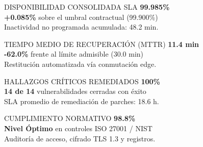 \documentclass[11pt,letterpaper]{article}
\begin{document}
\noindent
\begin{minipage}[t]{0.485\textwidth}
  \begin{corpmetric}{DISPONIBILIDAD CONSOLIDADA SLA}
    {\fontsize{18}{20}\selectfont\bfseries\color{corpPrimary} 99.985\%}\\[2pt]
    {\footnotesize\color{corpSuccess}\textbf{+0.085\%} sobre el umbral contractual (99.900\%)}\\[1pt]
    {\scriptsize\color{corpTextMuted}Inactividad no programada acumulada: 48.2 min.}
  \end{corpmetric}
\end{minipage}\hfill
\begin{minipage}[t]{0.485\textwidth}
  \begin{corpmetric}{TIEMPO MEDIO DE RECUPERACI\'ON (MTTR)}
    {\fontsize{18}{20}\selectfont\bfseries\color{corpPrimary} 11.4 min}\\[2pt]
    {\footnotesize\color{corpSuccess}\textbf{-62.0\%} frente al l\'imite admisible (30.0 min)}\\[1pt]
    {\scriptsize\color{corpTextMuted}Restituci\'on automatizada v\'ia conmutaci\'on edge.}
  \end{corpmetric}
\end{minipage}

\vspace{0.3em}

\noindent
\begin{minipage}[t]{0.485\textwidth}
  \begin{corpmetric}{HALLAZGOS CR\'ITICOS REMEDIADOS}
    {\fontsize{18}{20}\selectfont\bfseries\color{corpPrimary} 100\%}\\[2pt]
    {\footnotesize\color{corpSuccess}\textbf{14 de 14} vulnerabilidades cerradas con \'exito}\\[1pt]
    {\scriptsize\color{corpTextMuted}SLA promedio de remediaci\'on de parches: 18.6 h.}
  \end{corpmetric}
\end{minipage}\hfill
\begin{minipage}[t]{0.485\textwidth}
  \begin{corpmetric}{CUMPLIMIENTO NORMATIVO}
    {\fontsize{18}{20}\selectfont\bfseries\color{corpPrimary} 98.8\%}\\[2pt]
    {\footnotesize\color{corpSuccess}\textbf{Nivel \'Optimo} en controles ISO 27001 / NIST}\\[1pt]
    {\scriptsize\color{corpTextMuted}Auditor\'ia de acceso, cifrado TLS 1.3 y registros.}
  \end{corpmetric}
\end{minipage}
\end{document}
